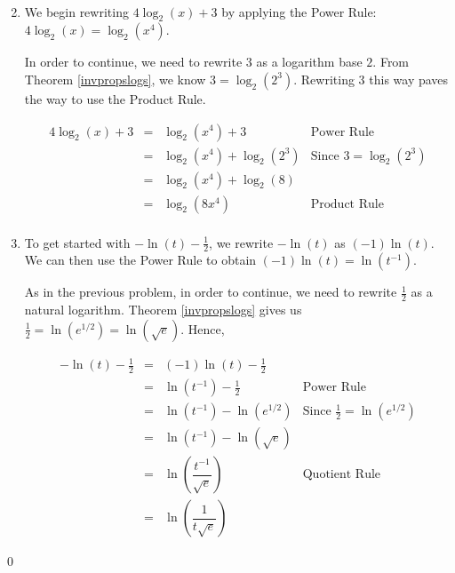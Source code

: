 \documentclass{ximera}
\begin{document}
\begin{ex}
\begin{enumerate}
\[\begin{array}{rclr}
                            
\end{array}\]
\setlength{\extrarowheight}{2pt}

\item  We begin rewriting $4\log_{2}(x) + 3$ by applying the Power Rule:  $4\log_{2}(x) = \log_{2}\left(x^4\right)$.

In order to continue, we need to rewrite $3$ as a logarithm base $2$.  From Theorem \ref{invpropslogs}, we know $3 = \log_{2}\left(2^3\right)$.  Rewriting $3$ this way paves the way to use the Product Rule.

\setlength{\extrarowheight}{4pt}
\[ \begin{array}{rclr}

4\log_{2}(x) + 3 & = & \log_{2}\left(x^4\right) + 3  & \mbox{Power Rule} \\ 
                             & = & \log_{2}\left(x^4\right) + \log_{2}\left(2^3\right)& \mbox{Since $3 = \log_{2}\left(2^3\right)$} \\
                             & = & \log_{2}\left(x^4\right) + \log_{2}(8)& \\
                             & = & \log_{2}\left( 8x^4\right) & \mbox{Product Rule} \\
                             
                            
\end{array}\]
\setlength{\extrarowheight}{2pt}

\item To get started with $-\ln(t) - \frac{1}{2}$, we rewrite  $-\ln(t)$ as $(-1) \ln(t)$.  We can then use the Power Rule to obtain $(-1)\ln(t) = \ln\left(t^{-1}\right)$.

As in the previous problem, in order to continue, we need to rewrite $\frac{1}{2}$ as a natural logarithm. Theorem \ref{invpropslogs} gives us $\frac{1}{2} = \ln\left(e^{1/2}\right) = \ln\left(\sqrt{e}\right)$.  Hence,

\setlength{\extrarowheight}{6pt}
\[ \begin{array}{rclr}

-\ln(t) - \frac{1}{2} & = & (-1)\ln(t) - \frac{1}{2}  &  \\ 
                             & = & \ln\left(t^{-1}\right) - \frac{1}{2} & \mbox{Power Rule} \\
                             & = & \ln\left(t^{-1}\right) - \ln\left(e^{1/2}\right)& \mbox{Since $\frac{1}{2} = \ln\left(e^{1/2}\right)$} \\
                             & = & \ln\left(t^{-1}\right) - \ln\left(\sqrt{e} \right)& \\ [6pt]
                             & = & \ln\left(\dfrac{t^{-1}}{\sqrt{e}}\right) & \mbox{Quotient Rule} \\ [10pt]
                             & = & \ln\left(\dfrac{1}{t\sqrt{e}}\right) &
\end{array}\]
\setlength{\extrarowheight}{2pt}

\end{enumerate}

\vspace{-.3in} \qed

\end{ex}
\end{document}
